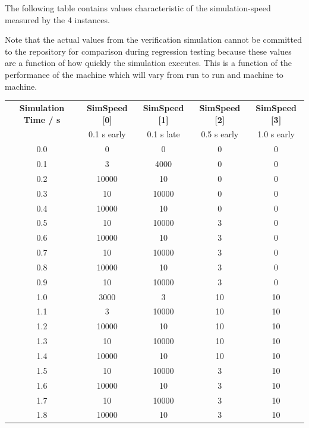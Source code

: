 \documentclass[11pt,fleqn]{report}
\begin{document}
The following table contains values characteristic of
the simulation-speed measured by the 4 instances.

Note that the actual values from the
verification simulation cannot be committed to the repository for comparison
during regression testing because these values are a function of how quickly
the simulation executes. This is a function of the performance of the machine
which will vary from run to run and machine to machine.

\begin{center}
\begin{tabular}{|c|c|c|c|c|}
\hline
 \textbf{Simulation Time / s} & \textbf{SimSpeed [0]}  & \textbf{SimSpeed [1]} &
 \textbf{SimSpeed [2]} & \textbf{SimSpeed [3]} \\
     & 0.1 s early & 0.1 s late & 0.5 s early & 1.0 s early \\  \hline \hline
0.0  &     0   &     0  &  0  &   0   \\ \hline
0.1  &     3   &  4000  &  0  &   0   \\ \hline
0.2  & 10000   &    10  &  0  &   0   \\ \hline
0.3  &    10   & 10000  &  0  &   0   \\ \hline
0.4  & 10000   &    10  &  0  &   0   \\ \hline
0.5  &    10   & 10000  &  3  &   0   \\ \hline
0.6  & 10000   &    10  &  3  &   0   \\ \hline
0.7  &    10   & 10000  &  3  &   0   \\ \hline
0.8  & 10000   &    10  &  3  &   0   \\ \hline
0.9  &    10   & 10000  &  3  &   0   \\ \hline
1.0  &  3000   &     3  & 10  &  10   \\ \hline
1.1  &     3   & 10000  & 10  &  10   \\ \hline
1.2  & 10000   &    10  & 10  &  10   \\ \hline
1.3  &    10   & 10000  & 10  &  10   \\ \hline
1.4  & 10000   &    10  & 10  &  10   \\ \hline
1.5  &    10   & 10000  &  3  &  10   \\ \hline
1.6  & 10000   &    10  &  3  &  10   \\ \hline
1.7  &    10   & 10000  &  3  &  10   \\ \hline
1.8  & 10000   &    10  &  3  &  10   \\ \hline

\end{tabular}
\end{center}
\end{document}

